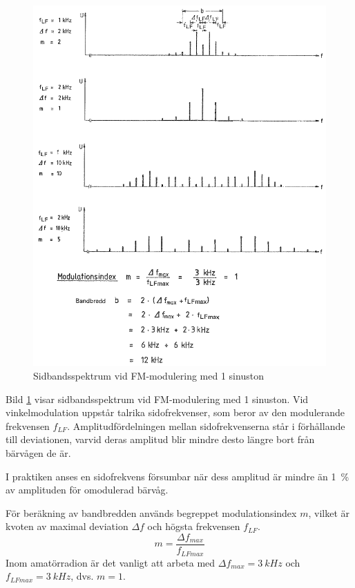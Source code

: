 \begin{figure}
\includegraphics[width=\textwidth]{images/cropped_pdfs/bild_2_1-31.pdf}
\caption{Sidbandsspektrum vid FM-modulering med 1 sinuston}
\label{fig:BildII1-31}
\end{figure}

Bild \ref{fig:BildII1-31} visar sidbandsspektrum vid FM-modulering med 1
sinuston. Vid vinkelmodulation uppstår talrika sidofrekvenser, som beror av den
modulerande frekvensen \(f_{LF}\). Amplitudfördelningen mellan sidofrekvenserna 
står i förhållande till deviationen, varvid deras amplitud blir mindre desto längre 
bort från bärvågen de är.

I praktiken anses en sidofrekvens försumbar när dess amplitud är mindre än 1~\%
av amplituden för omodulerad bärvåg.

För beräkning av bandbredden används begreppet modulationsindex \(m\), vilket är
kvoten av maximal deviation \(\Delta f\) och högsta frekvensen \(f_{LF}\).
\[
	m = \dfrac{\Delta f_{max}}{f_{LFmax}}
\]
Inom amatörradion är det vanligt att arbeta med \(\Delta f_{max} = \SI{3}{kHz}\) och
\(f_{LFmax} = \SI{3}{kHz}\), dvs. \(m = 1\).

